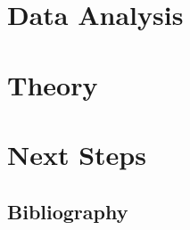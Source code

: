 \documentclass[
  a4paper,
]{article}
\begin{document}
\hypertarget{sec:data}{%
\section{Data Analysis}\label{sec:data}}

\hypertarget{sec:theory}{%
\section{Theory}\label{sec:theory}}

\hypertarget{sec:next_steps}{%
\section{Next Steps}\label{sec:next_steps}}

\newpage

\hypertarget{bibliography}{%
\subsection*{Bibliography}\label{bibliography}}
\end{document}
